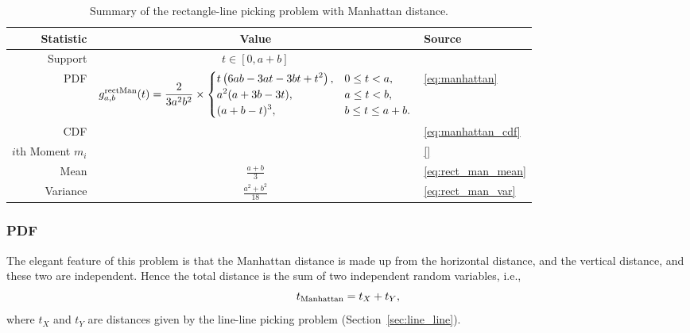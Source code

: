\begin{table}[ht]
  \centering
  \begin{tabular}{|r|c|l|}
    \hline
    Statistic & Value & Source \\ 
    \hline
      Support            & $t \in [0, a+b]$ & \\
      PDF                & $ \displaystyle
 g^{\rm rect Man}_{a,b}(t) = \frac{2}{3 a^2 b^2} \times 
 \begin{cases}
 \displaystyle t \left(6 a b-3 a t-3 b t+t^2\right), & 0 \le t < a, \\
 \displaystyle a^2 (a+3 b-3 t),                      & a \le t <  b, \\
 \displaystyle (a+b-t)^3,                            & b \le t \le  a + b.\\
 \end{cases}
                             $ &
                             \eqref{eq:manhattan} \\
      CDF                &  & 
                             \eqref{eq:manhattan_cdf}\\
      $i$th Moment $m_i$ &  &
                             \eqref{} \\
      Mean               & $\displaystyle \frac{a+b}{3}$ &
                             \eqref{eq:rect_man_mean} \\
      Variance           & $\displaystyle  \frac{a^{2} + b^2}{18}$ &
                             \eqref{eq:rect_man_var} \\[1.5ex]
    \hline
  \end{tabular}
  \caption{Summary of the rectangle-line picking problem with Manhattan distance.}
  \label{tab:summary_rect_man}
\end{table}

\subsubsection{PDF}

The elegant feature of this problem is that the Manhattan distance is
made up from the horizontal distance, and the vertical distance, and
these two are independent. Hence the total distance is the sum of two
independent random variables, i.e.,
\[ t_{\rm Manhattan} = t_X + t_Y, \]
where $t_X$ and $t_Y$ are distances given by the line-line picking
problem (Section~\ref{sec:line_line}).

